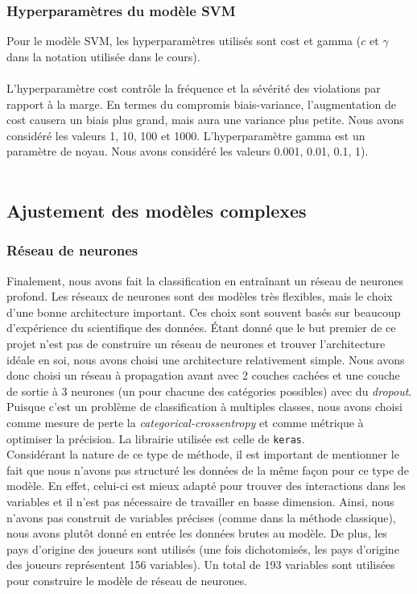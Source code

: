 \subsubsection{Hyperparamètres du modèle SVM}
Pour le modèle SVM, les hyperparamètres utilisés sont cost et gamma ($c$ et $\gamma$ dans la notation utilisée dans le cours).\\ \\ 
L'hyperparamètre cost contrôle la fréquence et la sévérité des violations par rapport à la marge. En termes du compromis biais-variance, l'augmentation de cost causera un biais plus grand, mais aura une variance plus petite. Nous avons considéré les valeurs 1, 10, 100 et 1000. L'hyperparamètre gamma est un paramètre de noyau. Nous avons considéré les valeurs 0.001, 0.01, 0.1, 1).\\ \\ 

\subsection{Ajustement des modèles complexes}

\subsubsection{Réseau de neurones}

Finalement, nous avons fait la classification en entraînant un réseau de neurones profond. Les réseaux de neurones sont des modèles très flexibles, mais le choix d'une bonne architecture important. Ces choix sont souvent basés sur beaucoup d'expérience du scientifique des données. Étant donné que le but premier de ce projet n'est pas de construire un réseau de neurones et trouver l'architecture idéale en soi, nous avons choisi une architecture relativement simple. Nous avons donc choisi un réseau à propagation avant avec 2 couches cachées et une couche de sortie à 3 neurones (un pour chacune des catégories possibles) avec du \textit{dropout}. Puisque c'est un problème de classification à multiples classes, nous avons choisi comme mesure de perte la \textit{categorical-crossentropy} et comme métrique à optimiser la précision. La librairie utilisée est celle de \texttt{keras}.\\

Considérant la nature de ce type de méthode, il est important de mentionner le fait que nous n'avons pas structuré les données de la même façon pour ce type de modèle. En effet, celui-ci est mieux adapté pour trouver des interactions dans les variables et il n'est pas nécessaire de travailler en basse dimension. Ainsi, nous n'avons pas construit de variables précises (comme dans la méthode classique), nous avons plutôt donné en entrée les données brutes au modèle. De plus, les pays d'origine des joueurs sont utilisés (une fois dichotomisés, les pays d'origine des joueurs représentent 156 variables). Un total de 193 variables sont utilisées pour construire le modèle de réseau de neurones.

